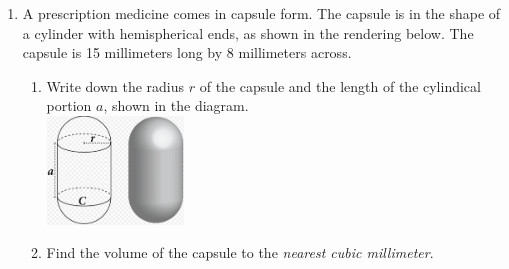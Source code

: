 \documentclass[12pt, twoside]{article}
\begin{document}
\begin{enumerate}
\item A prescription medicine comes in capsule form. The capsule is in the shape of a cylinder with hemispherical ends, as shown in the rendering below. The capsule is 15 millimeters long by 8 millimeters across.
\begin{enumerate}
    \item Write down the radius $r$ of the capsule and the length of the cylindical portion $a$, shown in the diagram.\\
    \includegraphics[width=0.3\textwidth]{capsule.png}\\
    \item Find the volume of the capsule to the \emph{nearest cubic millimeter}.
  \end{enumerate}

\end{enumerate}
\end{document}
